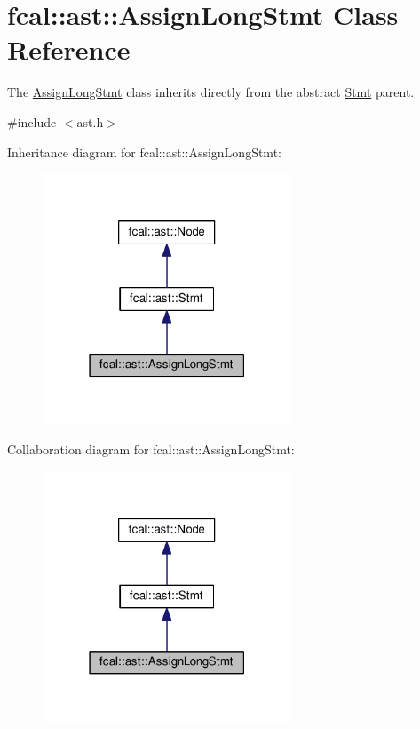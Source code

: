 \hypertarget{classfcal_1_1ast_1_1AssignLongStmt}{}\section{fcal\+:\+:ast\+:\+:Assign\+Long\+Stmt Class Reference}
\label{classfcal_1_1ast_1_1AssignLongStmt}


The \hyperlink{classfcal_1_1ast_1_1AssignLongStmt}{Assign\+Long\+Stmt} class inherits directly from the abstract \hyperlink{classfcal_1_1ast_1_1Stmt}{Stmt} parent.  




{\ttfamily \#include $<$ast.\+h$>$}



Inheritance diagram for fcal\+:\+:ast\+:\+:Assign\+Long\+Stmt\+:\nopagebreak
\begin{figure}[H]
\begin{center}
\leavevmode
\includegraphics[width=210pt]{classfcal_1_1ast_1_1AssignLongStmt__inherit__graph}
\end{center}
\end{figure}


Collaboration diagram for fcal\+:\+:ast\+:\+:Assign\+Long\+Stmt\+:\nopagebreak
\begin{figure}[H]
\begin{center}
\leavevmode
\includegraphics[width=210pt]{classfcal_1_1ast_1_1AssignLongStmt__coll__graph}
\end{center}
\end{figure}
